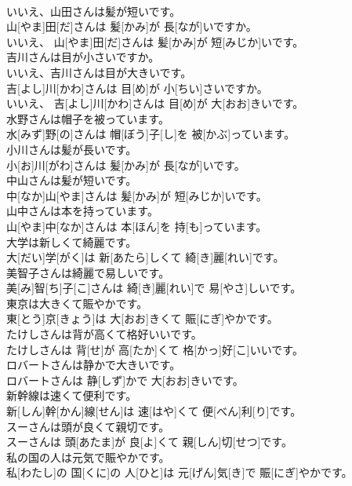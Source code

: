 \documentclass[8pt]{extreport}
\begin{document}
\begin{CJK}{UTF8}{min}
\\	いいえ、山田さんは髪が短いです。	
\\	山[やま]田[だ]さんは 髪[かみ]が 長[なが]いですか。 
\\	いいえ、 山[やま]田[だ]さんは 髪[かみ]が 短[みじか]いです。
\\	吉川さんは目が小さいですか。 
\\	いいえ、吉川さんは目が大きいです。	
\\	吉[よし]川[かわ]さんは 目[め]が 小[ちい]さいですか。 
\\	いいえ、 吉[よし]川[かわ]さんは 目[め]が 大[おお]きいです。
\\	水野さんは帽子を被っています。	
\\	水[みず]野[の]さんは 帽[ぼう]子[し]を 被[かぶ]っています。
\\	小川さんは髪が長いです。	
\\	小[お]川[がわ]さんは 髪[かみ]が 長[なが]いです。
\\	中山さんは髪が短いです。	
\\	中[なか]山[やま]さんは 髪[かみ]が 短[みじか]いです。
\\	山中さんは本を持っています。	
\\	山[やま]中[なか]さんは 本[ほん]を 持[も]っています。
\\	大学は新しくて綺麗です。	
\\	大[だい]学[がく]は 新[あたら]しくて 綺[き]麗[れい]です。
\\	美智子さんは綺麗で易しいです。	
\\	美[み]智[ち]子[こ]さんは 綺[き]麗[れい]で 易[やさ]しいです。
\\	東京は大きくて賑やかです。	
\\	東[とう]京[きょう]は 大[おお]きくて 賑[にぎ]やかです。
\\	たけしさんは背が高くて格好いいです。	
\\	たけしさんは 背[せ]が 高[たか]くて 格[かっ]好[こ]いいです。
\\	ロバートさんは静かで大きいです。	
\\	ロバートさんは 静[しず]かで 大[おお]きいです。
\\	新幹線は速くて便利です。	
\\	新[しん]幹[かん]線[せん]は 速[はや]くて 便[べん]利[り]です。
\\	スーさんは頭が良くて親切です。	
\\	スーさんは 頭[あたま]が 良[よ]くて 親[しん]切[せつ]です。
\\	私の国の人は元気で賑やかです。	
\\	私[わたし]の 国[くに]の 人[ひと]は 元[げん]気[き]で 賑[にぎ]やかです。

\end{CJK}
\end{document}
